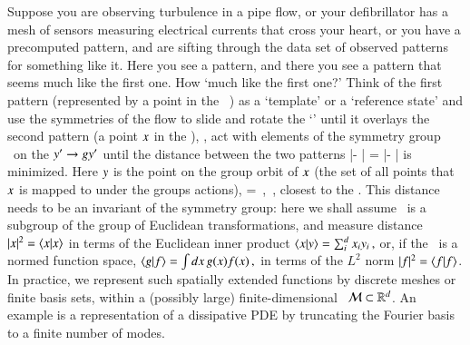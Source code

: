 

Suppose you are observing turbulence in a pipe flow, or your
defibrillator has a mesh of sensors measuring electrical currents that
cross your heart, or you have a precomputed pattern, and are sifting
through the data set of observed patterns for something like it. Here you
see a pattern, and there you see a pattern that seems much like the first
one. How `much like the first one?' Think of the first pattern
(represented by a point {\slicep} in the \statesp\  \pS) as a
`template' or a
`reference state' and use the symmetries of the flow to slide and rotate
the `{\template}' until it overlays the second pattern (a point $x$ in
the \statesp), \ie, act with elements of the symmetry group \Group\ on
the {\template} ${{y'}} \to {\ensuremath{g}}{{\ensuremath{y'}}}$ until the distance between
the two patterns
\beq
|\ssp - {\LieEl}{\slicep}|
    = |\sspRed - \slicep|
\label{minDistance0}
\eeq
is minimized. Here $y$ is the point on the group orbit of $x$
(the set of all points that $x$ is mapped to under the groups
actions),
\beq
\ssp=\LieEl \sspRed
	\,,\qquad
\LieEl \in \Group
\,,
closest to the {\template} {\slicep}.
This distance needs to be an invariant of the symmetry group: here
we shall assume \Group\ is a subgroup of the group of Euclidean
transformations, and measure distance
$|\ssp|^2=\braket{\ssp}{\ssp}$ in terms of the Euclidean inner product
\( %
\braket{x}{y} = \sum_i^d {x}_i y_i
	\,,
\) %
or, if the \statesp\ is a normed function space,
\( %
\braket{g}{f} = \int dx \, {g}(x) f(x)
\,,
\) %
in terms of the $L^2$ norm $|f|^2 = \braket{f}{f}$. In practice, we
represent such spatially extended functions by discrete meshes or finite
basis sets, within a (possibly large) finite-dimensional \statesp\  ${\cal M}
\subset \mathbb{R}^d$. An example is a representation of a dissipative PDE by
truncating the Fourier basis  to a finite number of
modes.

